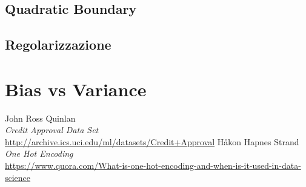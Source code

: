 \documentclass[a4paper,8pt]{article}
\begin{document}
\begin{multicols}{2}
\subsection{Quadratic Boundary}
\subsection{Regolarizzazione}
\section{Bias vs Variance}
\end{multicols}

\begin{thebibliography}{10}
	John Ross Quinlan \\
	\emph{Credit Approval Data Set} \\
	\url{http://archive.ics.uci.edu/ml/datasets/Credit+Approval}
	Håkon Hapnes Strand \\
	\emph{One Hot Encoding} \\
	\url{https://www.quora.com/What-is-one-hot-encoding-and-when-is-it-used-in-data-science}
	
\end{thebibliography}
\end{document}
